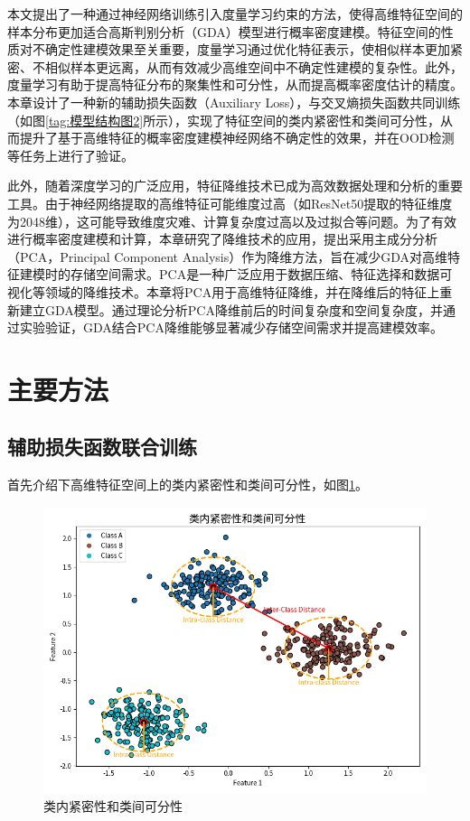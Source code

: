 本文提出了一种通过神经网络训练引入度量学习约束的方法，使得高维特征空间的样本分布更加适合高斯判别分析（GDA）模型进行概率密度建模。特征空间的性质对不确定性建模效果至关重要，度量学习通过优化特征表示，使相似样本更加紧密、不相似样本更远离，从而有效减少高维空间中不确定性建模的复杂性。此外，度量学习有助于提高特征分布的聚集性和可分性，从而提高概率密度估计的精度。本章设计了一种新的辅助损失函数（Auxiliary Loss），与交叉熵损失函数共同训练（如图\ref{tag:模型结构图2}所示），实现了特征空间的类内紧密性和类间可分性，从而提升了基于高维特征的概率密度建模神经网络不确定性的效果，并在OOD检测等任务上进行了验证。

此外，随着深度学习的广泛应用，特征降维技术已成为高效数据处理和分析的重要工具。由于神经网络提取的高维特征可能维度过高（如ResNet50提取的特征维度为2048维），这可能导致维度灾难\cite{murphy2012machine}、计算复杂度过高以及过拟合等问题。为了有效进行概率密度建模和计算，本章研究了降维技术的应用，提出采用主成分分析（PCA，Principal Component Analysis）作为降维方法，旨在减少GDA对高维特征建模时的存储空间需求。PCA是一种广泛应用于数据压缩、特征选择和数据可视化等领域的降维技术。本章将PCA用于高维特征降维，并在降维后的特征上重新建立GDA模型。通过理论分析PCA降维前后的时间复杂度和空间复杂度，并通过实验验证，GDA结合PCA降维能够显著减少存储空间需求并提高建模效率。
\section{主要方法}
\subsection{辅助损失函数联合训练}

首先介绍下高维特征空间上的类内紧密性和类间可分性，如图\ref{interintra}。

\begin{figure}[h]
    \centering
    \includegraphics[width=1.\linewidth]{assets/inter-intra.png}
    \caption{类内紧密性和类间可分性}
    \label{interintra}
\end{figure}

